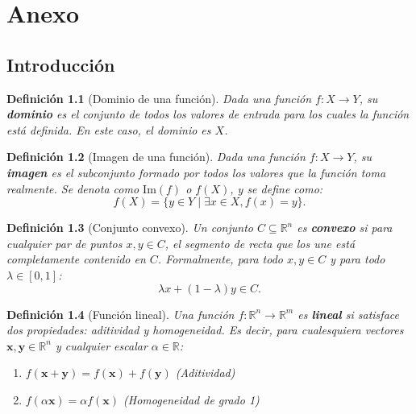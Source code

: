 \documentclass[12pt,a4paper]{book}
\newtheorem{defi}{Definición}[section]
\begin{document}





\chapter{Anexo}
\section{Introducción}
\begin{defi}[Dominio de una función]
\label{def:dominio}
Dada una función $f: X \to Y$, su \textbf{dominio} es el conjunto de todos los valores de entrada para los cuales la función está definida. En este caso, el dominio es $X$.
\end{defi}

\begin{defi}[Imagen de una función]
Dada una función $f: X \to Y$, su \textbf{imagen} es el subconjunto formado por todos los valores que la función toma realmente. Se denota como $\text{Im}(f)$ o $f(X)$, y se define como:
$$ f(X) = \{y \in Y \mid \exists x \in X, f(x) = y \} .$$
\end{defi}

\begin{defi}[Conjunto convexo]
\label{def:convexo}
Un conjunto $C \subseteq \mathbb{R}^n$ es \textbf{convexo} si para cualquier par de puntos $x, y \in C$, el segmento de recta que los une está completamente contenido en $C$. Formalmente, para todo $x, y \in C$ y para todo $\lambda \in [0, 1]$:
$$ \lambda x + (1-\lambda)y \in C .$$
\end{defi}

\begin{defi}[Función lineal]
\label{def:f_lineal}
Una función $f: \mathbb{R}^n \to \mathbb{R}^m$ es \textbf{lineal} si satisface dos propiedades: aditividad y homogeneidad. Es decir, para cualesquiera vectores $\mathbf{x}, \mathbf{y} \in \mathbb{R}^n$ y cualquier escalar $\alpha \in \mathbb{R}$:
\begin{enumerate}
    \item $f(\mathbf{x}+\mathbf{y}) = f(\mathbf{x}) + f(\mathbf{y})$ (Aditividad)
    \item $f(\alpha \mathbf{x}) = \alpha f(\mathbf{x})$ (Homogeneidad de grado 1)
\end{enumerate}
\end{defi}
\end{document}
